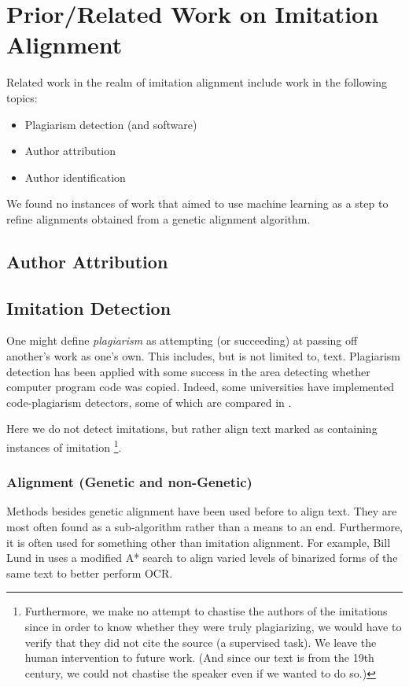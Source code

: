 \section {Prior/Related Work on Imitation Alignment}
Related work in the realm of imitation alignment include work in the following topics:
	\begin{itemize}
		\item Plagiarism detection (and software)
		\item Author attribution
		\item Author identification
	\end{itemize}

We found no instances of work that aimed to use machine learning as a step to refine alignments obtained from a genetic alignment algorithm.%


\subsection{Author Attribution}

\subsection{Imitation Detection}
One might define \textit{plagiarism} as attempting (or succeeding) at passing off another's work as one's own. This includes, but is not limited to, text. Plagiarism detection has been applied with some success in the area detecting whether computer program code was copied. Indeed, some universities have implemented code-plagiarism detectors, some of which are compared in \cite{doi:10.1080/08993400412331363843}.

Here we do not detect imitations, but rather align text marked as containing instances of imitation \footnote{Furthermore, we make no attempt to chastise the authors of the imitations since in order to know whether they were truly plagiarizing, we would have to verify that they did not cite the source (a supervised task). We leave the human intervention to future work. (And since our text is from the 19th century, we could not chastise the speaker even if we wanted to do so.)}.


\subsubsection{Alignment (Genetic and non-Genetic)}
Methods besides genetic alignment have been used before to align text. They are most often found as a sub-algorithm rather than a means to an end. Furthermore, it is often used for something other than imitation alignment. For example, Bill Lund in \cite{lund_binarization} uses a modified A* search to align varied levels of binarized forms of the same text to better perform OCR.

